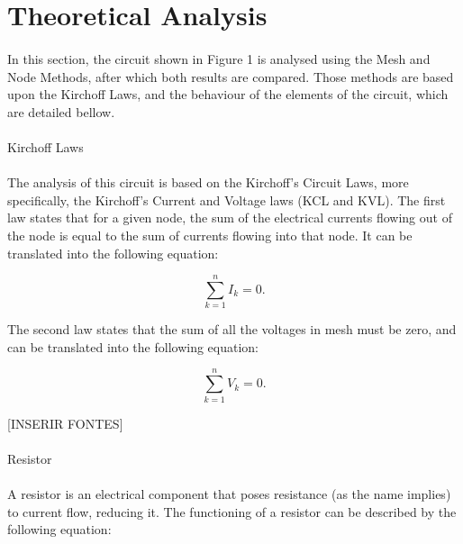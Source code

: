 \section{Theoretical Analysis}
\label{sec:analysis}

\paragraph{} In this section, the circuit shown in Figure 1 is analysed using the Mesh and Node Methods, after which both results are compared.
Those methods are based upon the Kirchoff Laws, and the behaviour of the elements of the circuit, which are detailed bellow.

\paragraph{} Kirchoff Laws

\paragraph{} The analysis of this circuit is based on the Kirchoff's Circuit Laws, more specifically, the Kirchoff's Current and Voltage laws (KCL and KVL). The first law states that
 for a given node, the sum of the electrical currents flowing out of the node is equal to the sum of currents flowing into that node. 
It can be translated into the following equation:

\begin{equation}
	\sum_{k = 1}^n I_k = 0.
	\label{eq:kcl}
\end{equation}

The second law states that the sum of all the voltages in mesh must be zero, and can be translated into the following equation:

\begin{equation}
	\sum_{k = 1}^n V_k = 0.
	\label{eq:kvl}
\end{equation}

[INSERIR FONTES]

\paragraph{}Resistor

\paragraph{}A resistor is an electrical component that poses resistance (as the name implies) to current flow, reducing it. The functioning of a resistor can be described
 by the following equation:


